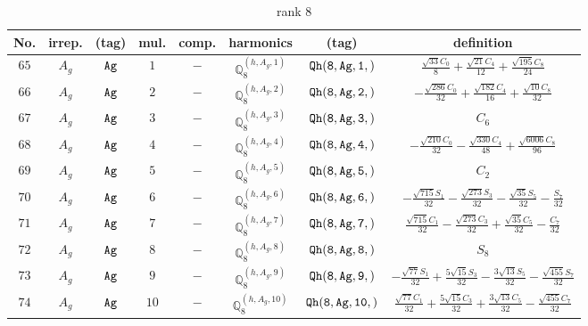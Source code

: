 \documentclass[fleqn,8pt]{jsarticle}
\begin{document}
\begin{table}[ht!]
\begin{center}
\caption{rank 8}
\renewcommand{\arraystretch}{1.3}
\begin{tabular}{cccccccc} \hline \hline
No. & irrep. & (tag) & mul. & comp. & harmonics & (tag) & definition \\ \hline
$ 65 $ & $ A_{g} $ & $ {\tt Ag} $ & $ 1 $ & $ - $ & $ \mathbb{Q}_{8}^{(h,A_{g},1)} $ & $ {\tt Qh(8,Ag,1,)} $ & $ \frac{\sqrt{33} C_{0}}{8} + \frac{\sqrt{21} C_{4}}{12} + \frac{\sqrt{195} C_{8}}{24} $ \\
$ 66 $ & $ A_{g} $ & $ {\tt Ag} $ & $ 2 $ & $ - $ & $ \mathbb{Q}_{8}^{(h,A_{g},2)} $ & $ {\tt Qh(8,Ag,2,)} $ & $ - \frac{\sqrt{286} C_{0}}{32} + \frac{\sqrt{182} C_{4}}{16} + \frac{\sqrt{10} C_{8}}{32} $ \\
$ 67 $ & $ A_{g} $ & $ {\tt Ag} $ & $ 3 $ & $ - $ & $ \mathbb{Q}_{8}^{(h,A_{g},3)} $ & $ {\tt Qh(8,Ag,3,)} $ & $ C_{6} $ \\
$ 68 $ & $ A_{g} $ & $ {\tt Ag} $ & $ 4 $ & $ - $ & $ \mathbb{Q}_{8}^{(h,A_{g},4)} $ & $ {\tt Qh(8,Ag,4,)} $ & $ - \frac{\sqrt{210} C_{0}}{32} - \frac{\sqrt{330} C_{4}}{48} + \frac{\sqrt{6006} C_{8}}{96} $ \\
$ 69 $ & $ A_{g} $ & $ {\tt Ag} $ & $ 5 $ & $ - $ & $ \mathbb{Q}_{8}^{(h,A_{g},5)} $ & $ {\tt Qh(8,Ag,5,)} $ & $ C_{2} $ \\
$ 70 $ & $ A_{g} $ & $ {\tt Ag} $ & $ 6 $ & $ - $ & $ \mathbb{Q}_{8}^{(h,A_{g},6)} $ & $ {\tt Qh(8,Ag,6,)} $ & $ - \frac{\sqrt{715} S_{1}}{32} - \frac{\sqrt{273} S_{3}}{32} - \frac{\sqrt{35} S_{5}}{32} - \frac{S_{7}}{32} $ \\
$ 71 $ & $ A_{g} $ & $ {\tt Ag} $ & $ 7 $ & $ - $ & $ \mathbb{Q}_{8}^{(h,A_{g},7)} $ & $ {\tt Qh(8,Ag,7,)} $ & $ \frac{\sqrt{715} C_{1}}{32} - \frac{\sqrt{273} C_{3}}{32} + \frac{\sqrt{35} C_{5}}{32} - \frac{C_{7}}{32} $ \\
$ 72 $ & $ A_{g} $ & $ {\tt Ag} $ & $ 8 $ & $ - $ & $ \mathbb{Q}_{8}^{(h,A_{g},8)} $ & $ {\tt Qh(8,Ag,8,)} $ & $ S_{8} $ \\
$ 73 $ & $ A_{g} $ & $ {\tt Ag} $ & $ 9 $ & $ - $ & $ \mathbb{Q}_{8}^{(h,A_{g},9)} $ & $ {\tt Qh(8,Ag,9,)} $ & $ - \frac{\sqrt{77} S_{1}}{32} + \frac{5 \sqrt{15} S_{3}}{32} - \frac{3 \sqrt{13} S_{5}}{32} - \frac{\sqrt{455} S_{7}}{32} $ \\
$ 74 $ & $ A_{g} $ & $ {\tt Ag} $ & $ 10 $ & $ - $ & $ \mathbb{Q}_{8}^{(h,A_{g},10)} $ & $ {\tt Qh(8,Ag,10,)} $ & $ \frac{\sqrt{77} C_{1}}{32} + \frac{5 \sqrt{15} C_{3}}{32} + \frac{3 \sqrt{13} C_{5}}{32} - \frac{\sqrt{455} C_{7}}{32} $ \\

\end{tabular}
\end{center}
\end{table}
\end{document}
